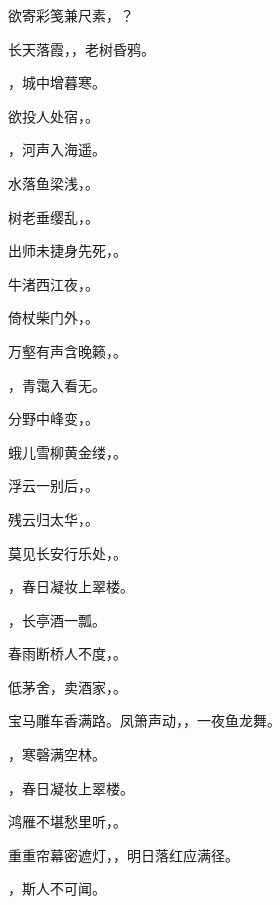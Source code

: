 \documentclass[12pt, a4paper, addpoints]{exam}
\begin{document}
\begin{questions}
\question[1] 欲寄彩笺兼尺素，\uline{\qquad\qquad\qquad}？

\question[1] 长天落霞，\uline{\qquad\qquad\qquad}，老树昏鸦。

\question[1] \uline{\qquad\qquad\qquad}，城中增暮寒。

\question[1] 欲投人处宿，\uline{\qquad\qquad\qquad}。

\question[1] \uline{\qquad\qquad\qquad}，河声入海遥。

\question[1] 水落鱼梁浅，\uline{\qquad\qquad\qquad}。

\question[1] 树老垂缨乱，\uline{\qquad\qquad\qquad}。

\question[1] 出师未捷身先死，\uline{\qquad\qquad\qquad}。

\question[1] 牛渚西江夜，\uline{\qquad\qquad\qquad}。

\question[1] 倚杖柴门外，\uline{\qquad\qquad\qquad}。

\question[1] 万壑有声含晚籁，\uline{\qquad\qquad\qquad}。

\question[1] \uline{\qquad\qquad\qquad}，青霭入看无。

\question[1] 分野中峰变，\uline{\qquad\qquad\qquad}。

\question[1] 蛾儿雪柳黄金缕，\uline{\qquad\qquad\qquad}。

\question[1] 浮云一别后，\uline{\qquad\qquad\qquad}。

\question[1] 残云归太华，\uline{\qquad\qquad\qquad}。

\question[1] 莫见长安行乐处，\uline{\qquad\qquad\qquad}。

\question[1] \uline{\qquad\qquad\qquad}，春日凝妆上翠楼。

\question[1] \uline{\qquad\qquad\qquad}，长亭酒一瓢。

\question[1] 春雨断桥人不度，\uline{\qquad\qquad\qquad}。

\question[1] 低茅舍，卖酒家，\uline{\qquad\qquad\qquad}。

\question[1] 宝马雕车香满路。凤箫声动，\uline{\qquad\qquad\qquad}，一夜鱼龙舞。

\question[1] \uline{\qquad\qquad\qquad}，寒磬满空林。

\question[1] \uline{\qquad\qquad\qquad}，春日凝妆上翠楼。

\question[1] 鸿雁不堪愁里听，\uline{\qquad\qquad\qquad}。

\question[1] 重重帘幕密遮灯，\uline{\qquad\qquad\qquad}，明日落红应满径。

\question[1] \uline{\qquad\qquad\qquad}，斯人不可闻。


\end{questions}
\end{document}
